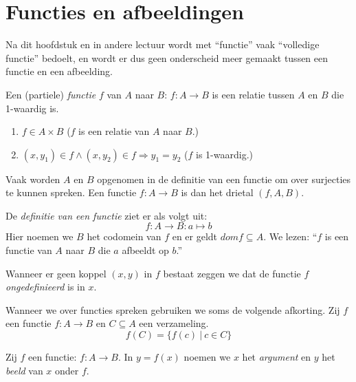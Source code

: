 \documentclass[main.tex]{subfiles}
\begin{document}
\chapter{Functies en afbeeldingen}
\label{cha:functies-en-afbeeldingen}

\begin{opm}
  Na dit hoofdstuk en in andere lectuur wordt met ``functie'' vaak ``volledige functie'' bedoelt, en wordt er dus geen onderscheid meer gemaakt tussen een functie en een afbeelding.
\end{opm}

\begin{de}
  Een (partiele) \emph{functie} $f$ van $A$ naar $B$: $f: A \rightarrow B$ is een relatie tussen $A$ en $B$ die 1-waardig is.
  \begin{enumerate}
  \item $f \in A \times B$ ($f$ is een relatie van $A$ naar $B$.)
  \item $(x,y_{1}) \in f \wedge (x,y_{2}) \in f \Rightarrow y_{1} = y_{2}$ ($f$ is 1-waardig.)
  \end{enumerate}
  Vaak worden $A$ en $B$ opgenomen in de definitie van een functie om over surjecties te kunnen spreken. Een functie $f: A \rightarrow B$ is dan het drietal $(f,A,B)$.
\end{de}

\begin{de}
  De \emph{definitie van een functie} ziet er als volgt uit:
  \[ f: A \rightarrow B: a \mapsto b \]
  Hier noemen we $B$ het codomein van $f$ en er geldt $dom f \subseteq A$.
  We lezen: ``$f$ is een functie van $A$ naar $B$ die $a$ afbeeldt op $b$.''
\end{de}

\begin{de}
  Wanneer er geen koppel $(x,y)$ in $f$ bestaat zeggen we dat de functie $f$ \emph{ongedefinieerd} is in $x$.
\end{de}

\begin{de}
  Wanneer we over functies spreken gebruiken we soms de volgende afkorting. Zij $f$ een functie $f: A \rightarrow B$ en $C \subseteq A$ een verzameling.
  \[ f(C) = \{ f(c)\ |\ c \in C \} \] 
\end{de}

\begin{de}
  Zij $f$ een functie: $f: A \rightarrow B$. 
  In $y = f(x)$ noemen we $x$ het \emph{argument} en $y$ het \emph{beeld} van $x$ onder $f$.
\end{de}
\end{document}
